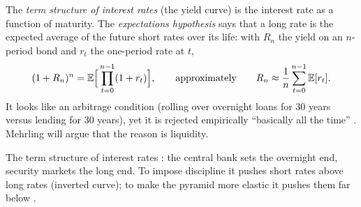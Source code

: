 \begin{paracol}{2}
\begin{definition}\label{def:nh-eh}
The \emph{term structure of interest rates} (the yield curve) is the interest rate as a function of maturity. The
\emph{expectations hypothesis} says that a long rate is the expected average of the future short rates over its life:
with $R_n$ the yield on an $n$-period bond and $r_t$ the one-period rate at $t$,
\[
  (1+R_n)^n = \mathbb{E}\Bigl[\,\prod_{t=0}^{n-1}(1+r_t)\Bigr], \qquad\text{approximately}\qquad R_n \approx \frac1n\sum_{t=0}^{n-1}\mathbb{E}[r_t].
\]
It looks like an arbitrage condition (rolling over overnight loans for 30 years versus lending for 30 years), yet it is
rejected empirically ``basically all the time'' . Mehrling will argue that the reason is
liquidity.
\end{definition}

\begin{nfigure}
\caption{The term structure of interest rates : the central bank sets the overnight end, security markets the
long end. To impose discipline it pushes short rates above long rates (inverted curve); to make the pyramid more elastic
it pushes them far below .}\label{fig:nh-term}
\end{nfigure}


\end{paracol}
